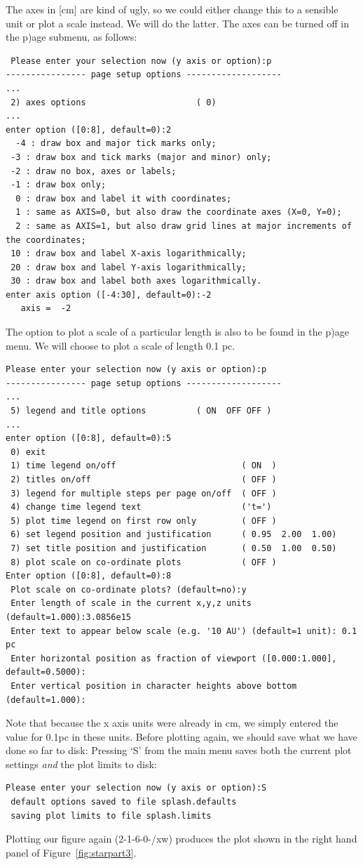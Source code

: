 \documentclass[a4paper,11pt]{article}
\begin{document}
 The axes in [cm] are kind of ugly, so we could either change this to a sensible unit or plot a scale instead. We will do the latter. The axes can be turned off in the p)age submenu, as follows:
\begin{verbatim}
 Please enter your selection now (y axis or option):p
---------------- page setup options -------------------
...
 2) axes options                      ( 0)
...
enter option ([0:8], default=0):2
  -4 : draw box and major tick marks only;
 -3 : draw box and tick marks (major and minor) only;
 -2 : draw no box, axes or labels;
 -1 : draw box only;
  0 : draw box and label it with coordinates;
  1 : same as AXIS=0, but also draw the coordinate axes (X=0, Y=0);
  2 : same as AXIS=1, but also draw grid lines at major increments of the coordinates;
 10 : draw box and label X-axis logarithmically;
 20 : draw box and label Y-axis logarithmically;
 30 : draw box and label both axes logarithmically.
enter axis option ([-4:30], default=0):-2
   axis =  -2
\end{verbatim}
The option to plot a scale of a particular length is also to be found in the p)age menu. We will choose to plot a scale of length 0.1 pc. 
\begin{verbatim}
Please enter your selection now (y axis or option):p
---------------- page setup options -------------------
...
 5) legend and title options          ( ON  OFF OFF )
...
enter option ([0:8], default=0):5
 0) exit 
 1) time legend on/off                         ( ON  )
 2) titles on/off                              ( OFF )
 3) legend for multiple steps per page on/off  ( OFF )
 4) change time legend text                    ('t=')
 5) plot time legend on first row only         ( OFF )
 6) set legend position and justification      ( 0.95  2.00  1.00)
 7) set title position and justification       ( 0.50  1.00  0.50)
 8) plot scale on co-ordinate plots            ( OFF )
Enter option ([0:8], default=0):8
 Plot scale on co-ordinate plots? (default=no):y
 Enter length of scale in the current x,y,z units (default=1.000):3.0856e15
 Enter text to appear below scale (e.g. '10 AU') (default=1 unit): 0.1 pc
 Enter horizontal position as fraction of viewport ([0.000:1.000], default=0.5000):
 Enter vertical position in character heights above bottom (default=1.000):
\end{verbatim}
Note that because the x axis units were already in cm, we simply entered the value for 0.1pc in these units. Before plotting again, we should save what we have done so far to disk: Pressing `S' from the main menu saves both the current plot settings \emph{and} the plot limits to disk:
\begin{verbatim}
Please enter your selection now (y axis or option):S
 default options saved to file splash.defaults
 saving plot limits to file splash.limits
\end{verbatim}
Plotting our figure again (2-1-6-0-/xw) produces the plot shown in the right hand panel of Figure~\ref{fig:starpart3}. 
\end{document}
